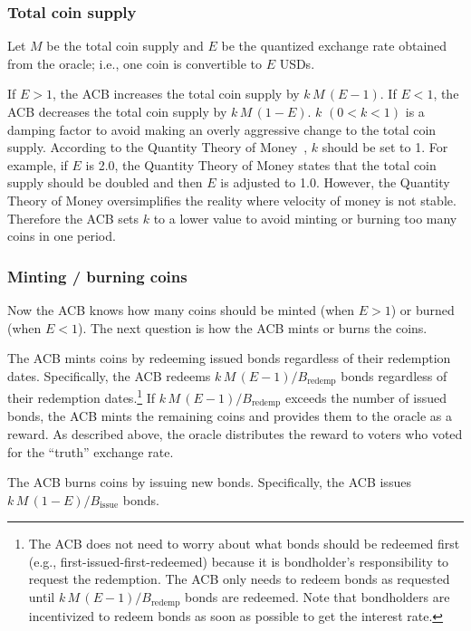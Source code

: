 \documentclass[dvipdfmx,a4paper]{article}
\begin{document}
\subsubsection{Total coin supply}

Let $M$ be the total coin supply and $E$ be the quantized exchange rate obtained from the oracle; i.e., one coin is convertible to $E$ USDs.

If $E>1$, the ACB increases the total coin supply by $k\,M\,(E-1)$. If $E<1$, the ACB decreases the total coin supply by $k\,M\,(1-E)$. $k$ $(0<k<1)$ is a damping factor to avoid making an overly aggressive change to the total coin supply. According to the Quantity Theory of Money~\cite{mankiwmacro}, $k$ should be set to 1. For example, if $E$ is 2.0, the Quantity Theory of Money states that the total coin supply should be doubled and then $E$ is adjusted to 1.0. However, the Quantity Theory of Money oversimplifies the reality where velocity of money is not stable. Therefore the ACB sets $k$ to a lower value to avoid minting or burning too many coins in one period.

\subsubsection{Minting / burning coins}

Now the ACB knows how many coins should be minted (when $E>1$) or burned (when $E<1$). The next question is how the ACB mints or burns the coins.

The ACB mints coins by redeeming issued bonds regardless of their redemption dates. Specifically, the ACB redeems $k\,M\,(E-1)/B_{\mathrm{redemp}}$ bonds regardless of their redemption dates.\footnote{The ACB does not need to worry about what bonds should be redeemed first (e.g., first-issued-first-redeemed) because it is bondholder's responsibility to request the redemption. The ACB only needs to redeem bonds as requested until $k\,M\,(E-1)/B_{\mathrm{redemp}}$ bonds are redeemed. Note that bondholders are incentivized to redeem bonds as soon as possible to get the interest rate.} If $k\,M\,(E-1)/B_{\mathrm{redemp}}$ exceeds the number of issued bonds, the ACB mints the remaining coins and provides them to the oracle as a reward. As described above, the oracle distributes the reward to voters who voted for the ``truth'' exchange rate.

The ACB burns coins by issuing new bonds. Specifically, the ACB issues $k\,M\,(1-E)/B_{\mathrm{issue}}$ bonds.
\end{document}
